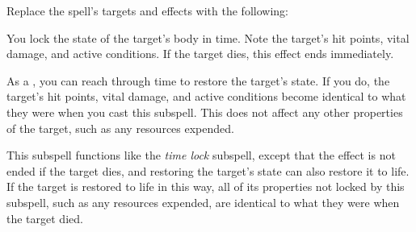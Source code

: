 Replace the spell's targets and effects with the following:
\begin{spellcontent}

\begin{augmenttargetinginfo}



\end{augmenttargetinginfo}


\begin{augmenteffects}



\spelleffect
You lock the state of the target's body in time.
Note the target's hit points, vital damage, and active conditions.
If the target dies, this effect ends immediately.

As a , you can reach through time to restore the target's state.
If you do, the target's hit points, vital damage, and active conditions become identical to what they were when you cast this subspell.
This does not affect any other properties of the target, such as any resources expended.








\end{augmenteffects}

\end{spellcontent}






This subspell functions like the \textit{time lock} subspell, except that the effect is not ended if the target dies, and restoring the target's state can also restore it to life.
If the target is restored to life in this way, all of its properties not locked by this subspell, such as any resources expended, are identical to what they were when the target died.









